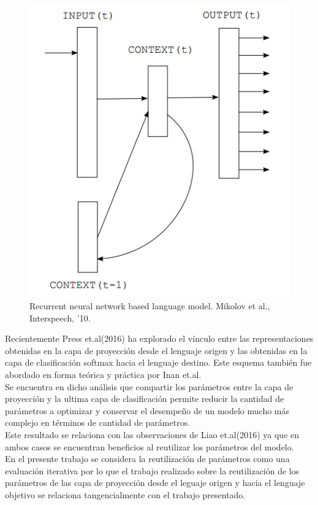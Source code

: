 \documentclass{article}
\begin{document}
	\begin{figure}[H]
		\centering
		\includegraphics[scale=0.5]{RNNLanguageModel.png}
		\caption{Recurrent neural network based language model. Mikolov et al., Interspeech, ’10.}
		\label{RNNLanguageModel}
	\end{figure}
	
	Recientemente Press et.al(2016)\cite{53SharingInputAndOutputEmbeddings} ha explorado el vínculo entre las representaciones obtenidas en la capa de proyección desde el lenguaje origen y las obtenidas en la capa de clasificación softmax hacia el lenguaje destino. Este esquema también fue abordado en forma teórica y práctica por Inan et.al\cite{63WordEmbeddingTyingTheory}.\\
	Se encuentra en dicho análisis que compartir los parámetros entre la capa de proyección y la ultima capa de clasificación permite reducir la cantidad de parámetros a optimizar y conservar el desempeño de un modelo mucho más complejo en términos de cantidad de parámetros.\\
	Este resultado se relaciona con las observaciones de Liao et.al(2016)\cite{2BridgingGaps} ya que en ambos casos se encuentran beneficios al reutilizar los parámetros del modelo.\\
	En el presente trabajo se considera la reutilización de parámetros como una evaluación iterativa por lo que el trabajo realizado sobre la reutilización de los parámetros de las capa de proyección desde el leguaje origen y hacia el lenguaje objetivo se relaciona tangencialmente con el trabajo presentado.
	
\end{document}
